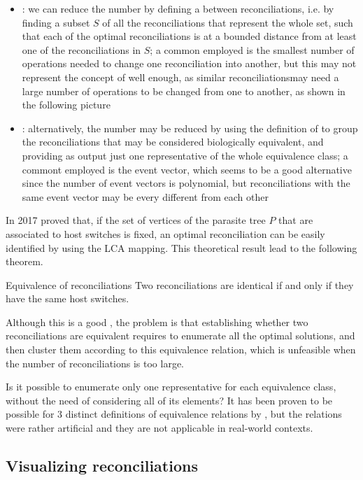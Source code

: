 \documentclass[a4paper, 12pt]{report}
\begin{document}
    \begin{itemize}
        \item {}: we can reduce the number by defining a  between reconciliations, i.e. by finding a subset $S$ of all the reconciliations that represent the whole set, such that each of the optimal reconciliations is at a bounded distance from at least one of the reconciliations in $S$; a common  employed is the smallest number of operations needed to change one reconciliation into another, but this may not represent the concept of  well enough, as similar reconciliationsmay need a large number of operations to be changed from one to another, as shown in the following picture

        \item {}: alternatively, the number may be reduced by using the definition of  to group the reconciliations that may be considered biologically equivalent, and providing as output just one representative of the whole equivalence class; a commont  employed is the event vector, which seems to be a good alternative since the number of event vectors is polynomial, but reconciliations with the same event vector may be every different from each other
    \end{itemize}

    In 2017 \textcite{gastaldello} proved that, if the set of vertices of the parasite tree $P$ that are associated to host switches is fixed, an optimal reconciliation can be easily identified by using the LCA mapping. This theoretical result lead to the following theorem.

    \begin{framedthm}{Equivalence of reconciliations}
        Two reconciliations are identical if and only if they have the same host switches.
    \end{framedthm}


    Although this is a good , the problem is that establishing whether two reconciliations are equivalent requires to enumerate all the optimal solutions, and then cluster them according to this equivalence relation, which is unfeasible when the number of reconciliations is too large.

    Is it possible to enumerate only one representative for each equivalence class, without the need of considering all of its elements? It has been proven to be possible for 3 distinct definitions of equivalence relations by \textcite{wang}, but the relations were rather artificial and they are not applicable in real-world contexts.

    \subsection{Visualizing reconciliations}

    \printbibliography
\end{document}
